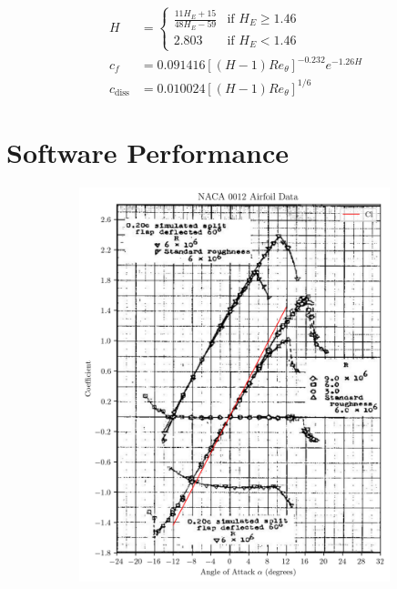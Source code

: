 \documentclass{article}
\begin{document}
\begin{align}
    H &= \begin{cases}
        \frac{11 H_E + 15}{48H_E - 59} & \text{if } H_E  \ge 1.46 \\
        2.803 & \text{if } H_E < 1.46
    \end{cases} \\
    c_f &= 0.091416\left[(H-1)Re_\theta \right]^{-0.232}e^{-1.26H} \\
    c_\text{diss} &= 0.010024\left[(H-1)Re_\theta \right]^{1/6}
\end{align}

\section{Software Performance}


\begin{figure}[H]
    \centering
    \captionsetup{justification=centering}
    \begin{subfigure}{0.45\textwidth}
        \includegraphics[width=0.99\textwidth]{figures/NACA0012_lift_validation.png}

\end{subfigure}
\end{figure}
\end{document}
